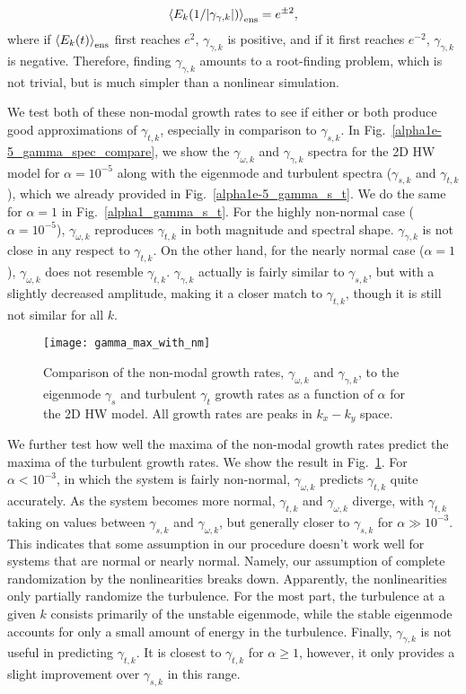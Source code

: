 \documentclass[letter,scriptaddress,twocolumn, prl,showkeys]{revtex4}
\def\beq{\begin{equation}}
\def\eeq{\end{equation}}
\begin{document}
\beq
\label{gamma_pm2}
\left< E_k(1/|\gamma_{\gamma,k}|) \right>_{\rm{ens}} = e^{\pm 2},
\eeq
where if $\left< E_k(t) \right>_{\rm{ens}}$ first reaches $e^2$, $\gamma_{\gamma,k}$ is positive, and if it first reaches $e^{-2}$, $\gamma_{\gamma,k}$ is negative.
Therefore, finding $\gamma_{\gamma,k}$ amounts to a root-finding problem, which is not trivial, but is much simpler than a nonlinear simulation. 

We test both of these non-modal growth rates to see if either or both produce good approximations of $\gamma_{t,k}$, especially in comparison to $\gamma_{s,k}$. 
In Fig.~\ref{alpha1e-5_gamma_spec_compare}, we show the $\gamma_{\omega,k}$ and $\gamma_{\gamma,k}$ spectra for the 2D HW
model for $\alpha=10^{-5}$ along with the eigenmode and turbulent spectra ($\gamma_{s,k}$ and $\gamma_{t,k}$), which we already provided in Fig.~\ref{alpha1e-5_gamma_s_t}. We do the same for
$\alpha=1$ in Fig.~\ref{alpha1_gamma_s_t}. For the highly non-normal case ($\alpha = 10^{-5}$), $\gamma_{\omega,k}$ reproduces $\gamma_{t,k}$ in both magnitude and spectral shape. $\gamma_{\gamma,k}$
is not close in any respect to $\gamma_{t,k}$. On the other hand, for the nearly normal case ($\alpha=1$), $\gamma_{\omega,k}$ does not resemble $\gamma_{t,k}$. $\gamma_{\gamma,k}$ actually is
fairly similar to $\gamma_{s,k}$, but with a slightly decreased amplitude, making it a closer match to $\gamma_{t,k}$, though it is still not similar for all $k$.

\begin{figure}
\centerline{\texttt{[image: gamma\_max\_with\_nm]}}
\caption{Comparison of the non-modal growth rates, $\gamma_{\omega,k}$ and $\gamma_{\gamma,k}$, to the eigenmode $\gamma_{s}$ and turbulent $\gamma_{t}$ growth rates as a function of $\alpha$
for the 2D HW model. All growth rates are peaks in $k_x-k_y$ space.}
\label{gamma_max_with_nm}
\end{figure}

We further test how well the maxima of the non-modal growth rates predict the maxima of the turbulent growth rates. We show the result in Fig.~\ref{gamma_max_with_nm}. For $\alpha < 10^{-3}$,
in which the system is fairly non-normal, $\gamma_{\omega,k}$ predicts $\gamma_{t,k}$ quite accurately. As the system becomes more normal, $\gamma_{t,k}$ and $\gamma_{\omega,k}$ diverge, with
$\gamma_{t,k}$ taking on values between $\gamma_{s,k}$ and $\gamma_{\omega,k}$, but generally closer to $\gamma_{s,k}$ for $\alpha \gg 10^{-3}$. 
This indicates that some assumption in our procedure doesn't work well for systems that are normal or nearly normal. Namely, our assumption
of complete randomization by the nonlinearities breaks down. Apparently, the nonlinearities only partially randomize the turbulence. For the most part, the turbulence at a given $k$ consists
primarily of the unstable eigenmode, while the stable eigenmode accounts for only a small amount of energy in the turbulence. Finally, $\gamma_{\gamma,k}$ is not useful in predicting $\gamma_{t,k}$.
It is closest to $\gamma_{t,k}$ for $\alpha \ge 1$, however, it only provides a slight improvement over $\gamma_{s,k}$ in this range.
\end{document}
